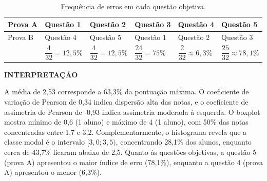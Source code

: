 \documentclass[a4paper,12pt]{article}
\begin{document}
    \begin{table}[H]
        \centering
        \renewcommand{\arraystretch}{1.1}
        \caption{Frequência de erros em cada questão objetiva.}
        \begin{tabular}{C{50pt}C{80pt}C{80pt}C{80pt}C{80pt}C{80pt}}
            \toprule
            Prova A & Questão 1 & Questão 2 & Questão 3 & Questão 4 & Questão 5 \\
            \midrule
            Prova B & Questão 4 & Questão 5 & Questão 1 & Questão 2 & Questão 3 \\
            \midrule
            & \(\dfrac{4}{32} = 12,5\%\) & \(\dfrac{4}{32} = 12,5\%\) & \(\dfrac{24}{32} = 75\%\) & \(\dfrac{2}{32} \approx 6,3\%\) & \(\dfrac{25}{32} \approx 78,1\%\) \\
            \cmidrule[0.08em](l{2pt}r{0pt}){2-6}
        \end{tabular}
    \end{table}
    
    \begin{figure}[H]
        \centering
        \caption{Histograma e boxplot da nota.}
        \begin{subfigure}[b]{0.5\textwidth}
            \centering
            
        \end{subfigure}
        \hfill
        \begin{subfigure}[b]{0.3\textwidth}
            \centering
            
        \end{subfigure}
        \label{H&B_Q1}
    \end{figure}
    
    \begin{flushleft}
        \textbf{INTERPRETAÇÃO}
    \end{flushleft}

    A média de 2,53 corresponde a 63,3\% da pontuação máxima. O coeficiente de variação de Pearson de 0,34 indica dispersão alta das notas, e o coeficiente de assimetria de Pearson de -0,93 indica assimetria moderada à esquerda. O boxplot mostra mínimo de 0,6 (1 aluno) e máximo de 4 (1 aluno), com 50\% das notas concentradas entre 1,7 e 3,2. Complementarmente, o histograma revela que a classe modal é o intervalo \([3,0;3,5)\), concentrando 28,1\% dos alunos, enquanto cerca de 43,7\% ficaram abaixo de 2,5. Quanto às questões objetivas, a questão 5 (prova A) apresentou o maior índice de erro (78,1\%), enquanto a questão 4 (prova A) apresentou o menor (6,3\%).
    
\end{document}
